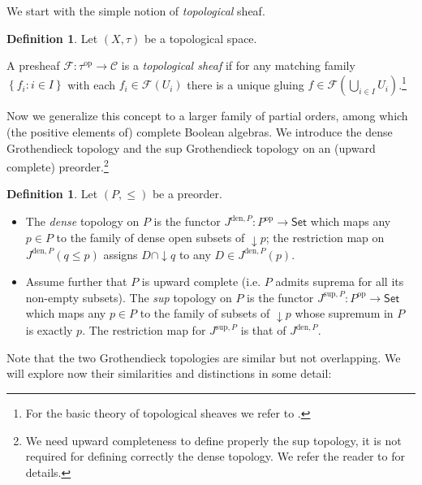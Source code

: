 \documentclass[11pt]{amsart}
\newcommand{\F}{\mathcal{F}}
\theoremstyle{plain}
\theoremstyle{definition}
\newtheorem{definition}[theorem]{Definition}
\theoremstyle{plain}
\theoremstyle{remark}
\newcommand{\dSet}{\mathsf{Set}}
\newcommand{\bp}[1]{\left\lbrace #1 \right\rbrace}
\newcommand{\0}{\mathsf{0}}
\renewcommand{\1}{\mathsf{1}}
\renewcommand{\2}{\mathsf{2}}
\theoremstyle{definition}
\begin{document}
We start with the simple notion of \emph{topological} sheaf.
\begin{definition}\label{def:globgrtop0}
Let $(X,\tau)$ be a topological space.

A presheaf $\F:\tau^{\mathrm{op}}\to\mathcal{C}$ is a \emph{topological sheaf} if for any matching family $\bp{f_i:i\in I}$ with each $f_i\in  \F(U_i)$ there is a unique gluing $f\in \F(\bigcup_{i\in I}U_i)$.\footnote{For the basic theory of topological sheaves we refer to \cite[Chapter II]{MacLMoer}.}

\end{definition}

Now we generalize this concept to a larger family of partial orders, among which (the positive elements of) complete Boolean algebras. We introduce the dense Grothendieck topology and the sup Grothendieck topology on an (upward complete) preorder.\footnote{We need upward completeness to define properly the sup topology, it is not required for defining correctly the dense topology. We refer the reader to \cite[Chapter III, Section 2, Examples (d), (e) pag. 114-115]{MacLMoer} for details.}

\begin{definition}
Let $(P,\leq)$ be a preorder. 

\begin{itemize}

\item
The \emph{dense} topology on $P$ is the functor
$J^{\mathrm{den},P}:P^{\mathrm{op}}\to\dSet$ which maps any $p \in P$ to the family of dense open subsets of $\downarrow p$; the restriction map on $J^{\mathrm{den},P}(q\leq p)$ assigns $D\cap \downarrow q$ to any $D \in J^{\mathrm{den},P}(p)$.
\item Assume further that $P$ is upward complete (i.e. $P$ admits suprema for all its non-empty subsets). The \emph{sup} topology on $P$ is the functor
$J^{\mathrm{sup},P}:P^{\mathrm{op}}\to\dSet$ which maps any $p \in P$ to the family of subsets of $\downarrow p$ whose supremum in $P$ is exactly $p$. The restriction map for $J^{\mathrm{sup},P}$ is that of $J^{\mathrm{den},P}$.
\end{itemize}

\end{definition}



Note that the two Grothendieck topologies are similar but not overlapping. We will explore now their similarities and distinctions in some detail:
\end{document}
